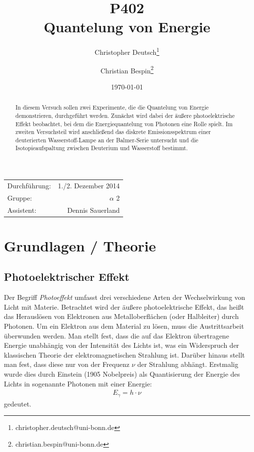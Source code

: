 \documentclass[11pt, a4paper]{article}
\title{P402 \\ Quantelung von Energie}
\author{Christopher Deutsch\footnote{christopher.deutsch@uni-bonn.de} \and Christian Bespin\footnote{christian.bespin@uni-bonn.de}}
\date{\today}
\numberwithin{equation}{section}
\begin{document}
\begin{titlepage}

\maketitle

\begin{center}
\begin{tabular}{l r}
Durchführung: & 1./2. Dezember 2014 \\
Gruppe: & $\alpha$ 2 \\
Assistent: & Dennis Sauerland
\end{tabular}
\end{center}

\begin{abstract}
\noindent
In diesem Versuch sollen zwei Experimente, die die Quantelung von Energie demonstrieren, durchgeführt werden.
Zunächst wird dabei der äußere photoelektrische Effekt beobachtet, bei dem die Energiequantelung von Photonen eine Rolle spielt.
Im zweiten Versuchsteil wird anschließend das diskrete Emissionsspektrum einer deuterierten Wasserstoff-Lampe an der Balmer-Serie untersucht und die Isotopieaufspaltung zwischen Deuterium und Wasserstoff bestimmt.
\end{abstract}

\end{titlepage}

\tableofcontents
\newpage


\section{Grundlagen / Theorie}

\subsection{Photoelektrischer Effekt}
\label{ssec:photoeffekt}
Der Begriff \emph{Photoeffekt} umfasst drei verschiedene Arten der Wechselwirkung von Licht mit Materie.
Betrachtet wird der äußere photoelektrische Effekt, das heißt das Herauslösen von Elektronen aus Metalloberflächen (oder Halbleiter) durch Photonen.
Um ein Elektron aus dem Material zu lösen, muss die Austrittsarbeit überwunden werden.
Man stellt fest, dass die auf das Elektron übertragene Energie unabhängig von der Intensität des Lichts ist, was ein Widerspruch der klassischen Theorie der elektromagnetischen Strahlung ist.
Darüber hinaus stellt man fest, dass diese nur von der Frequenz $\nu$ der Strahlung abhängt.
Erstmalig wurde dies durch Einstein (1905 Nobelpreis) als Quantisierung der Energie des Lichts in sogenannte Photonen mit einer Energie:
\begin{align*}
	E_\gamma = h \cdot \nu
\end{align*}
gedeutet.
\end{document}
